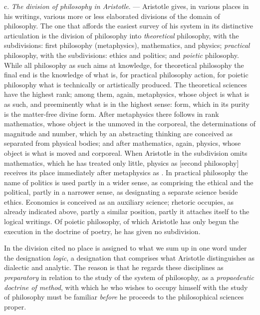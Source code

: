 c. \emph{The division of philosophy in Aristotle}. --- Aristotle gives,
in various places in his writings, various more or less elaborated
divisions of the domain of philosophy. The one that affords the easiest
survey of his system in its distinctive articulation is the division of
philosophy into \emph{theoretical} philosophy, with the
subdivisions: first philosophy (metaphysics), mathematics,
and physics; \emph{practical} philosophy, with the subdivisions: ethics
and politics; and \emph{poietic} philosophy. While all philosophy as
such aims at knowledge, for theoretical philosophy the final end is the
knowledge of what is, for practical philosophy action, for poietic
philosophy what is technically or artistically produced. The
theoretical sciences have the highest rank; among them, again,
metaphysics, whose object is what is as such, and preeminently what is
in the highest sense: form, which in its purity is the matter-free
divine form. After metaphysics there follows in rank mathematics, whose
object is the unmoved in the corporeal, the determinations of magnitude
and number, which by an abstracting thinking are conceived as separated
from physical bodies; and after mathematics, again, physics, whose
object is what is moved and corporeal. When Aristotle in the
subdivision omits mathematics, which he has treated only little,
physics as  [second philosophy] receives its
place immediately after metaphysics as . In
practical philosophy the name of politics is used partly in a wider
sense, as comprising the ethical and the political, partly in a
narrower sense, as designating a separate science beside ethics.
Economics is conceived as an auxiliary science; rhetoric occupies, as
already indicated above, partly a similar position, partly it attaches
itself to the logical writings. Of poietic philosophy, of which
Aristotle has only begun the execution in the doctrine of poetry, he
has given no subdivision.

In the division cited no place is assigned to what we sum up in one
word under the designation \emph{logic}, a designation that comprises
what Aristotle distinguishes as dialectic and analytic. The reason is
that he regards these disciplines as \emph{preparatory} in relation to
the study of the system of philosophy, as a \emph{propaedeutic doctrine
of method}, with which he who wishes to occupy himself with
the study of philosophy must be familiar \emph{before} he proceeds to
the philosophical sciences proper.


